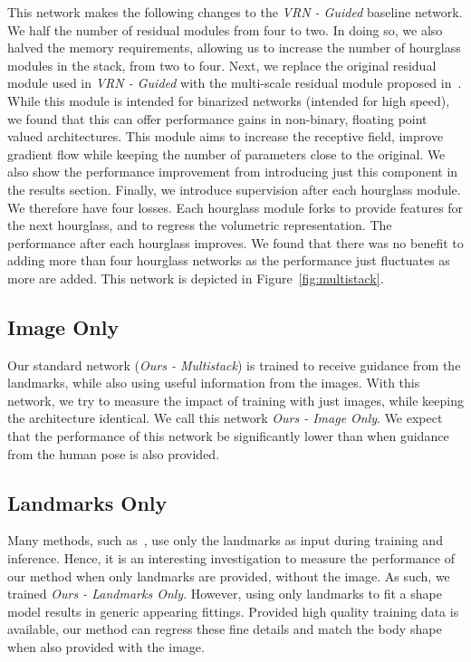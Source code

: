 This network makes the following changes to the \textit{VRN - Guided}
baseline network. We half the number of residual modules from four to
two. In doing so, we also halved the memory requirements, allowing us
to increase the number of hourglass modules in the stack, from two to
four. Next, we replace the original residual module used in
\textit{VRN - Guided} with the multi-scale residual module proposed
in~\cite{bulat2017binarized}. While this module is intended for
binarized networks (intended for high speed), we found that this can
offer performance gains in non-binary, floating point valued
architectures. This module aims to increase the receptive field,
improve gradient flow while keeping the number of parameters close to
the original. We also show the performance improvement from
introducing just this component in the results section. Finally, we
introduce supervision after each hourglass module. We therefore have
four losses. Each hourglass module forks to provide features for the
next hourglass, and to regress the volumetric representation. The
performance after each hourglass improves. We found that there was no
benefit to adding more than four hourglass networks as the performance
just fluctuates as more are added. This network is depicted in
Figure~\ref{fig:multistack}.

\subsection{Image Only} %

Our standard network (\textit{Ours - Multistack}) is trained to
receive guidance from the landmarks, while also using useful
information from the images. With this network, we try to measure the
impact of training with just images, while keeping the architecture
identical. We call this network \textit{Ours - Image Only}. We expect
that the performance of this network be significantly lower than when
guidance from the human pose is also provided.

\subsection{Landmarks Only} %

Many methods, such
as~\cite{bogo2016smplify,ramakrishna2012reconstructing}, use only the
landmarks as input during training and inference. Hence, it is an
interesting investigation to measure the performance of our method
when only landmarks are provided, without the image. As such, we
trained \textit{Ours - Landmarks Only}. However, using only landmarks
to fit a shape model results in generic appearing fittings. Provided
high quality training data is available, our method can regress these
fine details and match the body shape when also provided with the
image.

